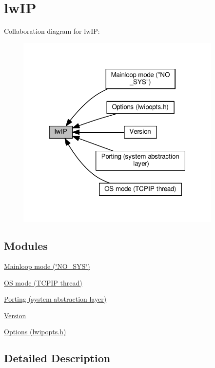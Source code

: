 \hypertarget{group__lwip}{}\section{lw\+IP}
\label{group__lwip}
Collaboration diagram for lw\+IP\+:
\nopagebreak
\begin{figure}[H]
\begin{center}
\leavevmode
\includegraphics[width=289pt]{group__lwip}
\end{center}
\end{figure}
\subsection*{Modules}
\begin{DoxyCompactItemize}
\item 
\hyperlink{group__lwip__nosys}{Mainloop mode (\char`\"{}\+N\+O\+\_\+\+S\+Y\+S\char`\"{})}
\item 
\hyperlink{group__lwip__os}{O\+S mode (\+T\+C\+P\+I\+P thread)}
\item 
\hyperlink{group__sys__layer}{Porting (system abstraction layer)}
\item 
\hyperlink{group__lwip__version}{Version}
\item 
\hyperlink{group__lwip__opts}{Options (lwipopts.\+h)}
\end{DoxyCompactItemize}


\subsection{Detailed Description}
